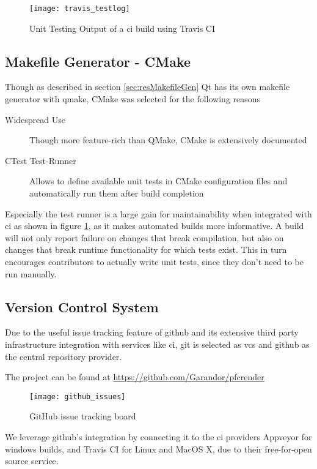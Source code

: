 \begin{figure}[htb]
	\texttt{[image: travis\_testlog]}
	\caption{Unit Testing Output of a \gls{ci} build using Travis CI}
	\label{fig:travistest}
\end{figure}

\subsection{Makefile Generator - CMake}
Though as described in section \ref{sec:resMakefileGen} Qt has its own makefile generator with qmake, CMake was selected for the following reasons
\begin{description}
	\item[Widespread Use] Though more feature-rich than QMake, CMake is extensively documented
	\item[CTest Test-Runner] Allows to define available unit tests in CMake configuration files and automatically run them after build completion 
\end{description}

Especially the test runner is a large gain for maintainability when integrated with \gls{ci} as shown in figure \ref{fig:travistest}, as it makes automated builds more informative.
A build will not only report failure on changes that break compilation, but also on changes that break runtime functionality for which tests exist. This in turn encourages contributors to actually write unit tests, since they don't need to be run manually.

\subsection{Version Control System}
Due to the useful issue tracking feature of \gls{github} and its extensive third party infrastructure integration with services like \gls{ci}, \gls{git} is selected as \gls{vcs} and \gls{github} as the central repository provider.

The project can be found at \url{https://github.com/Garandor/pfcrender}

\begin{figure}[htb]
	\texttt{[image: github\_issues]}
	\caption{GitHub issue tracking board}
	\label{fig:githubissues}
\end{figure}

We leverage \gls{github}'s integration by connecting it to the \gls{ci} providers Appveyor for windows builds, and Travis CI for Linux and MacOS X, due to their free-for-open source service.

